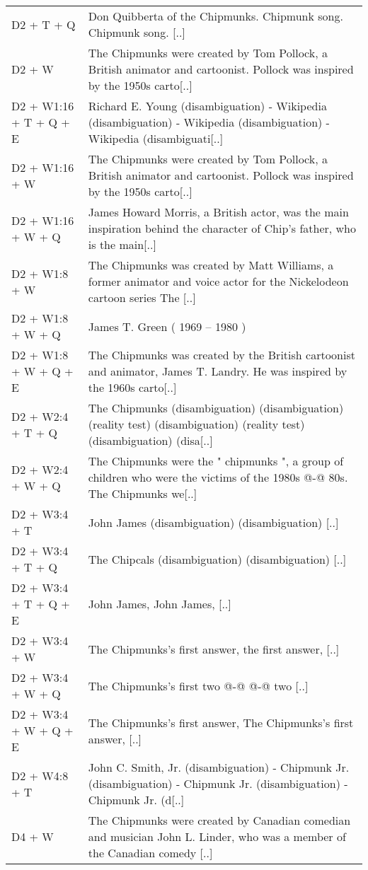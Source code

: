{\begin{longtable}{@{}l p{\dimexpr\textwidth-3cm-4\tabcolsep}@{}}
D2 + T + Q & Don Quibberta of the Chipmunks. Chipmunk song. Chipmunk song. [..] \\
D2 + W & The Chipmunks were created by Tom Pollock, a British animator and cartoonist. Pollock was inspired by the 1950s carto[..] \\
D2 + W1:16 + T + Q + E & Richard E. Young (disambiguation) - Wikipedia (disambiguation) - Wikipedia (disambiguation) - Wikipedia (disambiguati[..] \\
D2 + W1:16 + W & The Chipmunks were created by Tom Pollock, a British animator and cartoonist. Pollock was inspired by the 1950s carto[..] \\
D2 + W1:16 + W + Q & James Howard Morris, a British actor, was the main inspiration behind the character of Chip's father, who is the main[..] \\
D2 + W1:8 + W & The Chipmunks was created by Matt Williams, a former animator and voice actor for the Nickelodeon cartoon series The [..] \\
D2 + W1:8 + W + Q & James T. Green ( 1969 – 1980 )  \\
D2 + W1:8 + W + Q + E & The Chipmunks was created by the British cartoonist and animator, James T. Landry. He was inspired by the 1960s carto[..] \\
D2 + W2:4 + T + Q & The Chipmunks (disambiguation) (disambiguation) (reality test) (disambiguation) (reality test) (disambiguation) (disa[..] \\
D2 + W2:4 + W + Q & The Chipmunks were the " chipmunks ", a group of children who were the victims of the 1980s @-@ 80s. The Chipmunks we[..] \\
D2 + W3:4 + T & John James (disambiguation) (disambiguation) [..] \\
D2 + W3:4 + T + Q & The Chipcals (disambiguation) (disambiguation) [..] \\
D2 + W3:4 + T + Q + E & John James, John James, [..] \\
D2 + W3:4 + W & The Chipmunks's first answer, the first answer, [..] \\
D2 + W3:4 + W + Q & The Chipmunks's first two @-@ @-@ two [..] \\
D2 + W3:4 + W + Q + E & The Chipmunks's first answer, The Chipmunks's first answer, [..] \\
D2 + W4:8 + T & John C. Smith, Jr. (disambiguation) - Chipmunk Jr. (disambiguation) - Chipmunk Jr. (disambiguation) - Chipmunk Jr. (d[..] \\
D4 + W & The Chipmunks were created by Canadian comedian and musician John L. Linder, who was a member of the Canadian comedy [..] \\

\end{longtable}}
